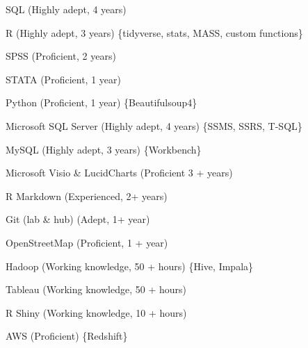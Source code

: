 

\begin{cvitems} %
        \item {SQL (Highly adept, 4 years)}
        \item {R (Highly adept, 3 years) \{tidyverse, stats, MASS, custom functions\}}
        \item {SPSS (Proficient, 2 years)}
        \item {STATA (Proficient, 1 year)}
        \item {Python (Proficient, 1 year) \{Beautifulsoup4\}}
\end{cvitems}

\cvsubsection{ }


\begin{cvitems} %
        \item {Microsoft SQL Server (Highly adept, 4 years) \{SSMS, SSRS, T-SQL\}}
        \item {MySQL (Highly adept, 3 years) \{Workbench\}}
        \item {Microsoft Visio \& LucidCharts (Proficient 3 + years)}
        \item {R Markdown (Experienced, 2+ years)}
        \item {Git (lab \& hub) (Adept, 1+ year)}
        \item {OpenStreetMap (Proficient, 1 + year)}
        \item {Hadoop (Working knowledge, 50 + hours) \{Hive, Impala\}}
        \item {Tableau (Working knowledge, 50 + hours)}
        \item {R Shiny (Working knowledge, 10 + hours)}
        \item {AWS (Proficient) \{Redshift\}}
\end{cvitems}

\cvsubsection{ }



